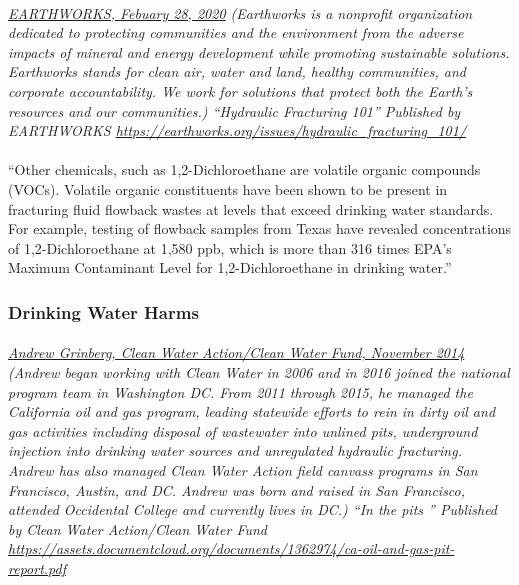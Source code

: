 \documentclass{article}
\begin{document}
\paragraph{}
\small
\textit{
\underline{EARTHWORKS, Febuary 28, 2020}
(Earthworks is a nonprofit organization dedicated to protecting communities and the environment from the adverse impacts of mineral and energy development while promoting sustainable solutions. Earthworks stands for clean air, water and land, healthy communities, and corporate accountability. We work for solutions that protect both the Earth’s resources and our communities.) “Hydraulic Fracturing 101” Published by EARTHWORKS 
\url{https://earthworks.org/issues/hydraulic_fracturing_101/}}
\normalsize

\paragraph{}
``Other chemicals, such as 1,2-Dichloroethane are volatile organic compounds (VOCs). Volatile organic constituents have been shown to be present in fracturing fluid flowback wastes at levels that exceed drinking water standards. For example, testing of flowback samples from Texas have revealed concentrations of 1,2-Dichloroethane at 1,580 ppb, which is more than 316 times EPA’s Maximum Contaminant Level for 1,2-Dichloroethane in drinking water.''

\subsubsection{Drinking Water Harms}
\paragraph{}
\small
\textit{  
\underline{Andrew Grinberg, Clean Water Action/Clean Water Fund, November 2014}
  (Andrew began working with Clean Water in 2006 and in 2016 joined the national program team in Washington DC. From 2011 through 2015, he managed the California oil and gas program, leading statewide efforts to rein in dirty oil and gas activities including disposal of wastewater into unlined pits, underground injection into drinking water sources and unregulated hydraulic fracturing. Andrew has also managed Clean Water Action field canvass programs in San Francisco, Austin, and DC. Andrew was born and raised in San Francisco, attended Occidental College and currently lives in DC.) “In the pits ” Published by Clean Water Action/Clean Water Fund 
\url{https://assets.documentcloud.org/documents/1362974/ca-oil-and-gas-pit-report.pdf} }
\normalsize
\end{document}
